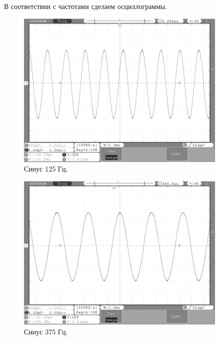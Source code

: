 	В соответствии с частотами сделаем осциллограммы.
	
	\begin{figure}[H]
    \centering
    \includegraphics[width=0.9\textwidth]{../image/125.bmp}
    \caption{Синус 125 Гц.}
	\end{figure}	
	
	\begin{figure}[H]
    \centering
    \includegraphics[width=0.9\textwidth]{../image/375.bmp}
    \caption{Синус 375 Гц.}
	\end{figure}	
	

